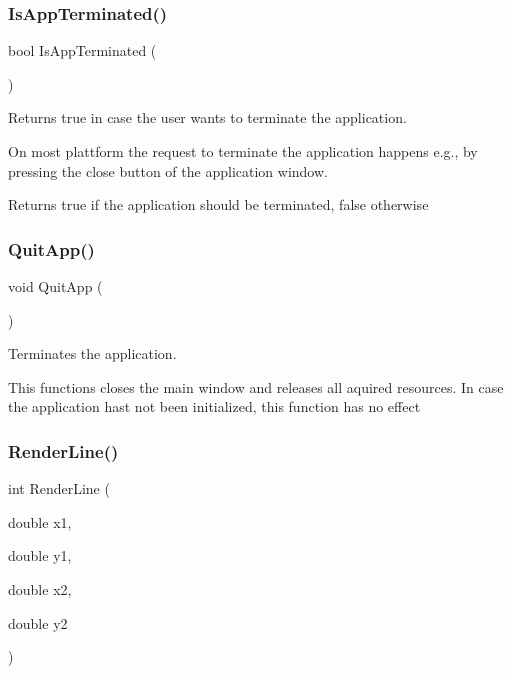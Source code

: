 \subsubsection{\texorpdfstring{Is\+App\+Terminated()}{IsAppTerminated()}}
{\footnotesize\ttfamily bool Is\+App\+Terminated (\begin{DoxyParamCaption}{ }\end{DoxyParamCaption})}

Returns {\ttfamily true} in case the user want\textquotesingle{}s to terminate the application.

On most plattform the request to terminate the application happens e.\+g., by pressing the close button of the application window.

\begin{DoxyReturn}{Returns}
{\ttfamily true} if the application should be terminated, {\ttfamily false} otherwise 
\end{DoxyReturn}
\mbox{\label{group__sdl__group_gaf4cba1685a7c46bccc7bbdf863114cee}} 
\subsubsection{\texorpdfstring{Quit\+App()}{QuitApp()}}
{\footnotesize\ttfamily void Quit\+App (\begin{DoxyParamCaption}{ }\end{DoxyParamCaption})}

Terminates the application.

This functions closes the main window and releases all aquired resources. In case the application hast not been initialized, this function has no effect \mbox{\label{group__sdl__group_gade420aec0a7492d5ac5f320b1ff4a814}} 
\subsubsection{\texorpdfstring{Render\+Line()}{RenderLine()}}
{\footnotesize\ttfamily int Render\+Line (\begin{DoxyParamCaption}\item[{double}]{x1,  }\item[{double}]{y1,  }\item[{double}]{x2,  }\item[{double}]{y2 }\end{DoxyParamCaption})}

